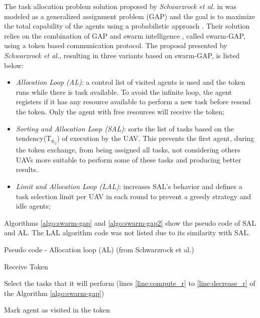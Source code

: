 The task allocation problem solution proposed by \textit{Schwarzrock et al.} in \cite{MAS07} was modeled as a generalized assignment problem (GAP)\cite{ferreira2007swarm} and the goal is to maximize the total capability of the agents using a probabilistic approach \cite{theraulaz1998response}. Their solution relies on the combination of GAP and swarm intelligence \cite{MOEA07}, called swarm-GAP, using a token based communication protocol. The proposal presented by \textit{Schwarzrock et al.}\cite{MAS07}, resulting in three variants based on swarm-GAP,  is listed below:

\begin{itemize}
   \item \textit{Allocation Loop (AL)}: a control list of visited agents is used and the token runs while there is task available. To avoid the infinite loop, the agent registers if it has any resource available to perform a new task before resend the token. Only the agent with free resources will receive the token;
   \item \textit{Sorting and Allocation Loop (SAL)}: sorts the list of tasks based on the tendency($\textrm{T}_{\theta_{ij}}$) of execution by the UAV. This prevents the first agent, during the token exchange, from being assigned all tasks, not considering others UAVs more suitable to perform some of these tasks and producing better results. 
   \item \textit{Limit and Allocation Loop (LAL)}: increases SAL's behavior and defines a task selection limit per UAV in each round to prevent a greedy strategy and idle agents;
\end{itemize}

Algorithms \ref{algo:swarm-gap} and \ref{algo:swarm-gap2} show the pseudo code of SAL and AL. The LAL algorithm code was not listed due to its similarity with SAL.

\begin{algorithm}[h!t]
	\caption{Pseudo code - Allocation loop (AL) (from Schwarzrock et al.\cite{MAS07})}
	\label{algo:swarm-gap}
	
	\SetAlgoLined
	\DontPrintSemicolon
	\SetNlSkip{0.3em}
	
	Receive Token\; \label{line:recebe}
	
	Select the tasks that it will perform (lines \ref{line:compute_r} to \ref{line:decrease_r} of the Algorithm \ref{algo:swarm-gap}) \;
	
	Mark agent as visited in the token\; \label{line:ALini}
\end{algorithm}

